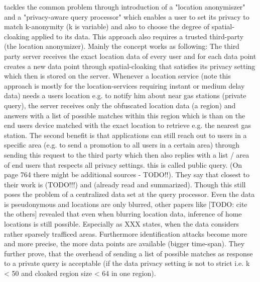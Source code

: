 \parencite{casper} tackles the common problem through introduction of a "location anonymiszer" and a "privacy-aware query processor" which enables a user to set its privacy to match k-anonymity (k is variable) and also to choose the degree of spatial-cloaking applied to its data. This approach also requires a trusted third-party (the location anonymizer). Mainly the concept works as following: The third party server receives the exact location data of every user and for each data point creates a new data point through spatial-cloaking that satisfies its privacy setting which then is stored on the server. Whenever a location service (note this approach is mostly for the location-services requiring instant or medium delay data) needs a users location e.g. to notify him about near gas stations (private query), the server receives only the obfuscated location data (a region) and answers with a list of possible matches within this region which is than on the end users device matched with the exact location to retrieve e.g. the nearest gas station. The second benefit is that applications can still reach out to users in a specific area (e.g. to send a promotion to all users in a certain area) through sending this request to the third party which then also replies with a list / area of end users that respects all privacy settings. this is called public query. (On page 764 there might be additional sources - TODO!!). They say that closest to their work is \parencite{gedik2004customizable} (TODO!!!) and \parencite{gruteser2003anonymous} (already read and summarized). Though this still poses the problem of a centralized data set at the query processor. Even the data is pseudonymous and locations are only blurred, other papers like [TODO: cite the others] revealed that even when blurring location data, inference of home locations is still possible. Especially as XXX states, when the data considers rather sparsely trafficed areas. Furthermore identification attacks become more and more precise, the more data points are available (bigger time-span). They further prove, that the overhead of sending a list of possible matches as response to a private query is acceptable (if the data privacy setting is not to strict i.e. k < 50 and cloaked region size < 64 in one region).

